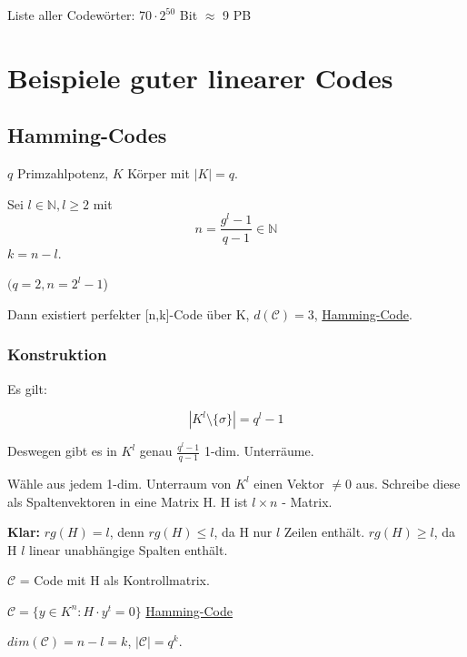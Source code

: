 \documentclass[a4paper, openany]{book}
\begin{document}
Liste aller Codewörter: $70 \cdot 2^{50}$ Bit $\approx$ 9 PB

\chapter{Beispiele guter linearer Codes}

\section{Hamming-Codes}

$q$ Primzahlpotenz, $K$ Körper mit $|K| = q$.

Sei $l \in \mathbb{N}, l \ge 2$ mit \[ n = \frac{g^l -1}{q-1} \in \mathbb{N} \] $k = n-l$.

$(q = 2, n= 2^l -1$)

\par \medskip

Dann existiert perfekter [n,k]-Code über K, $d(\mathcal{C}) = 3$, \underline{Hamming-Code}.

\subsection{Konstruktion}

Es gilt:

\[|K^l \setminus \{\sigma\}| = q^l -1 \] 

Deswegen gibt es in $K^l$ genau $\frac{q^l -1}{q-1}$ 1-dim. Unterräume.

\par \medskip

Wähle aus jedem 1-dim. Unterraum von $K^l$ einen Vektor $\neq 0$ aus. Schreibe diese als Spaltenvektoren in eine Matrix H. H ist $l \times n$ - Matrix.

\par \medskip

\textbf{Klar:} $rg(H) = l$, denn $rg(H) \le l$, da H nur $l$ Zeilen enthält. $rg(H) \ge l$, da H $l$ linear unabhängige Spalten enthält.

\par \medskip

$\mathcal{C}$ = Code mit H als Kontrollmatrix.

$\mathcal{C} = \{y \in K^n : H \cdot y^t = 0 \}$ \underline{Hamming-Code}

\par \medskip

$dim(\mathcal{C}) = n-l = k$, $|\mathcal{C}| = q^k$.

\par \medskip
\end{document}
